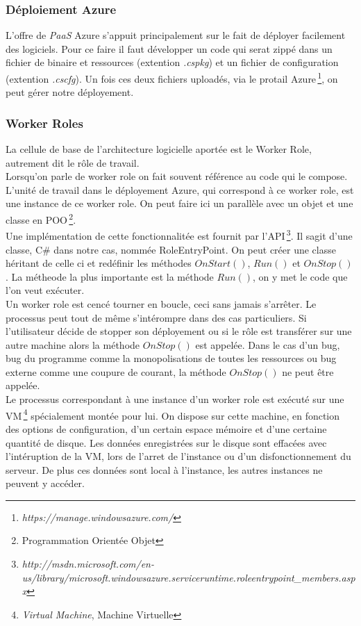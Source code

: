 \subsubsection{Déploiement Azure}
L'offre de \textit{PaaS} Azure s'appuit principalement sur le fait de
déployer facilement des logiciels. Pour ce faire il faut développer un
code qui serat zippé dans un fichier de binaire et ressources
(extention \textit{.cspkg}) et un fichier de configuration (extention
\textit{.cscfg}). Un fois ces deux fichiers uploadés, via le protail
Azure\,\footnote{\textit{https://manage.windowsazure.com/}}, on peut
gérer notre déployement. \\

\subsubsection{Worker Roles}
La cellule de base de l'architecture logicielle aportée est le Worker
Role, autrement dit le rôle de travail. \\

Lorsqu'on parle de worker role on fait souvent référence au code qui
le compose. L'unité de travail dans le déployement Azure, qui
correspond à ce worker role, est une instance de ce worker role.  On
peut faire ici un parallèle avec un objet et une classe en
POO\,\footnote{Programmation Orientée Objet}.\\


Une implémentation de cette fonctionnalitée est fournit par
l'API\,\footnote{\textit{http://msdn.microsoft.com/en-us/library/microsoft.windowsazure.serviceruntime.roleentrypoint\_members.aspx}}. Il
sagit d'une classe, C\# dans notre cas, nommée RoleEntryPoint. On peut
créer une classe héritant de celle ci et redéfinir les méthodes
$OnStart()$, $Run()$ et $OnStop()$. La métheode la plus importante est
la méthode $Run()$, on y met le code que l'on veut exécuter.\\

Un worker role est cencé tourner en boucle, ceci sans jamais
s'arrêter. Le processus peut tout de même s'intérompre dans des cas
particuliers. Si l'utilisateur décide de stopper son déployement ou si
le rôle est transférer sur une autre machine alors la méthode
$OnStop()$ est appelée. Dans le cas d'un bug, bug du programme comme
la monopolisations de toutes les ressources ou bug externe comme une
coupure de courant, la méthode $OnStop()$ ne peut être appelée.\\

Le processus correspondant à une instance d'un worker role est exécuté
sur une VM\,\footnote{\textit{Virtual Machine}, Machine Virtuelle}
spécialement montée pour lui. On dispose sur cette machine, en
fonction des options de configuration, d'un certain espace mémoire et
d'une certaine quantité de disque. Les données enregistrées sur le
disque sont effacées avec l'intéruption de la VM, lors de l'arret de
l'instance ou d'un disfonctionnement du serveur. De plus ces données
sont local à l'instance, les autres instances ne peuvent y accéder.\\


